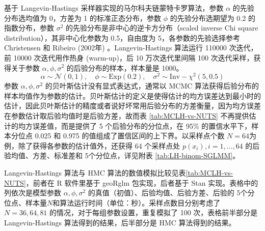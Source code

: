 \documentclass[12pt,a4paper,UTF8,twoside]{book}
\theoremstyle{definition}
\theoremstyle{definition}
\theoremstyle{definition}
\theoremstyle{remark}
\begin{document}
基于 Langevin-Hastings 采样器实现的马尔科夫链蒙特卡罗算法，参数
\(\alpha\) 的先验分布选均值为 0，方差为 1 的标准正态分布，参数 \(\phi\)
的先验分布选期望为 0.2 的指数分布，参数 \(\sigma^2\)
的先验分布是非中心的逆卡方分布（scaled inverse Chi square
distribution），其非中心化参数为 0.5，自由度为 5，各参数的先验选择参考
Christensen 和 Ribeiro (2002年) \citep{geoRglm2002}。Langevin-Hastings
算法运行 110000 次迭代，前 10000 次迭代用作热身 (warm-up)，后 10
万次迭代里间隔 100 次迭代采样，获得关于参数 \(\alpha,\phi,\sigma^2\)
的后验分布的样本，样本量是 1000。 \begin{equation}
\alpha \sim \mathcal{N}(0,1), \quad \phi \sim \mathrm{Exp}(0.2), \quad \sigma^2  \sim \mathrm{Inv-}\chi^2(5,0.5)
\end{equation} 参数 \(\alpha,\phi,\sigma^2\)
的贝叶斯估计没有显式表达式，通常以 MCMC
算法获得后验分布的样本均值作为参数的估计。贝叶斯估计的定义是使得估计的均方误差达到最小时的估计，因此贝叶斯估计的精度或者说好坏常用后验分布的方差衡量，因为均方误差在参数估计取后验均值时是后验方差，故而表
\ref{tab:MCLH-vs-NUTS} 不再提供估计的均方误差值，而是提供了 5
个后验分布的分位点，在 95\% 的置信水平下，样本分位点 0.025 和 0.975
的值组成了置信区间的上下界。以采样点个数
\(N =64\)为例，除了获得各参数的估计值外，还获得 64 个采样点处
\(p(x_i), i = 1, \ldots, 64\) 的后验均值、方差、标准差和
5个分位点，详见附表 \ref{tab:LH-binom-SGLMM}。

Langevin-Hastings 算法与 HMC
算法的数值模拟比较见表\ref{tab:MCLH-vs-NUTS}，前者在 R 软件里基于
geoRglm 包实现，后者基于 Stan 实现。表格中的列依次是模型参数
\(\alpha,\phi,\sigma^2\) 的真值（初值）、后验均值、后验方差、后验的
5个分位点、样本量\(N\)和算法运行时间（单位：秒）。采样点数目分别考虑了
\(N = 36, 64, 81\) 的情况，对于每组参数设置，重复模拟了 100
次，表格前半部分是 Langevin-Hastings 算法得到的结果，后半部分是 HMC
算法得到的结果。
\end{document}
